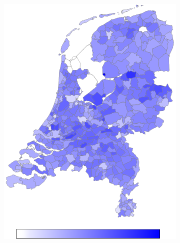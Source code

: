 \documentclass[a4paper,twoside,11pt]{article}
\begin{document}
\begin{figure}[h]
\begin{subfigure}[b]{0.12\textwidth}
                \includegraphics[width=\textwidth]{Heatmaps/HeatMap3.png}
                \caption{}
                \label{fig:HouseholdsChildren}
        \end{subfigure}
        \begin{subfigure}[b]{0.12\textwidth}

\end{subfigure}
\end{figure}
\end{document}
